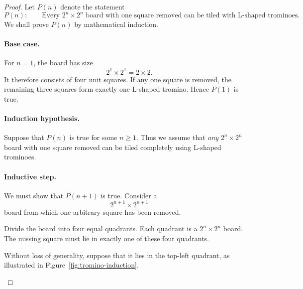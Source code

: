 \begin{proof}
Let $P(n)$ denote the statement
\[
P(n):\qquad
\text{Every $2^n\times2^n$ board with one square removed
can be tiled with L-shaped trominoes.}
\]
We shall prove $P(n)$ by mathematical induction.

\paragraph{Base case.}

For $n=1$, the board has size
\[
        2^1\times2^1=2\times2.
\]
It therefore consists of four unit squares. If any one square is
removed, the remaining three squares form exactly one L-shaped
tromino. Hence $P(1)$ is true.


\paragraph{Induction hypothesis.}

Suppose that $P(n)$ is true for some $n\geq1$. Thus we assume that
\emph{any} $2^n\times2^n$ board with one square removed can be tiled
completely using L-shaped trominoes.


\paragraph{Inductive step.}
We must show that $P(n+1)$ is true. Consider a
\[
        2^{n+1}\times2^{n+1}
\]
board from which one arbitrary square has been removed.

Divide the board into four equal quadrants. Each quadrant is a
$2^n\times2^n$ board. The missing square must lie in exactly one of
these four quadrants.

Without loss of generality, suppose that it lies in the top-left
quadrant, as illustrated in Figure~\ref{fig:tromino-induction}.

\begin{figure}[ht]
\centering

\end{figure}
\end{proof}
